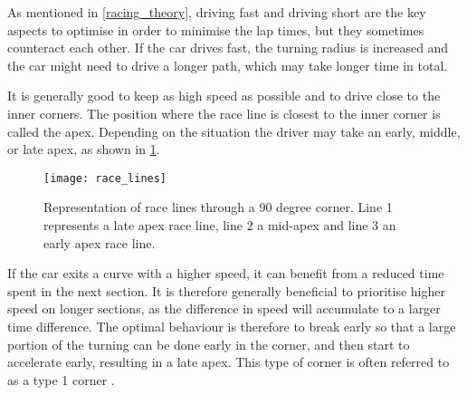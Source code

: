 


As mentioned in \ref{racing_theory}, driving fast and driving short are the key aspects to optimise in order to minimise the lap times, but they sometimes counteract each other. If the car drives fast, the turning radius is increased and the car might need to drive a longer path, which may take longer time in total. 

It is generally good to keep as high speed as possible and to drive close to the inner corners. The position where the race line is closest to the inner corner is called the apex. Depending on the situation the driver may take an early, middle, or late apex, as shown in \ref{figure:apex_variants}.

\begin{figure}[H]
    \centering
    \texttt{[image: race\_lines]}
    \caption{Representation of race lines through a 90 degree corner. Line 1 represents a late apex race line, line 2 a mid-apex and line 3 an early apex race line.}
    \label{figure:apex_variants}
\end{figure}

\noindent
If the car exits a curve with a higher speed, it can benefit from a reduced time spent in the next section. It is therefore generally beneficial to prioritise higher speed on longer sections\cite{beckman}, as the difference in speed will accumulate to a larger time difference. The optimal behaviour is therefore to break early so that a large portion of the turning can be done early in the corner, and then start to accelerate early, resulting in a late apex. This type of corner is often referred to as a type 1 corner \cite{edmondson}.

